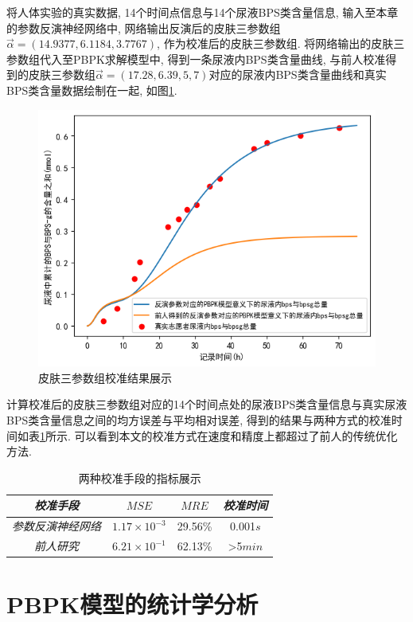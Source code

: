 \documentclass[a4paper,punct=banjiao,twoside]{ctexrep}
\theoremstyle{plain}
\theoremstyle{definition}
\theoremstyle{remark}
\begin{document}
将人体实验的真实数据, 14个时间点信息与14个尿液BPS类含量信息, 输入至本章的参数反演神经网络中, 网络输出反演后的皮肤三参数组$\vec{\alpha}=(14.9377,  6.1184,  3.7767)$, 作为校准后的皮肤三参数组.
将网络输出的皮肤三参数组代入至PBPK求解模型中, 得到一条尿液内BPS类含量曲线, 与前人校准得到的皮肤三参数组$\vec{\alpha}=(17.28,  6.39,  5,7)$对应的尿液内BPS类含量曲线和真实BPS类含量数据绘制在一起, 如图\ref{校准}.
\begin{figure}[H]
  \centering
  \includegraphics[scale=0.6]{./figs/p8.png}
  \caption{皮肤三参数组校准结果展示}
  \label{校准}
\end{figure}
\noindent 计算校准后的皮肤三参数组对应的14个时间点处的尿液BPS类含量信息与真实尿液BPS类含量信息之间的均方误差与平均相对误差, 得到的结果与两种方式的校准时间如表\ref{tab8}所示.
可以看到本文的校准方式在速度和精度上都超过了前人的传统优化方法.
\begin{table}[htbp]
  \centering
  \begin{tabular}[t]{c*{3}{c}}
    \hline
    \textit{校准手段} &$MSE$&$MRE$&\textit{校准时间}\\
    \hline
    \textit{参数反演神经网络} & $1.17\times 10^{-3}$  &   29.56\% &0.001$s$  \\ 
    \textit{前人研究} & $6.21\times 10^{-1}$  &  62.13\%    & >5$min$   \\ 
    \hline
  \end{tabular}
  \caption{\label{tab8}两种校准手段的指标展示} 
\end{table}  

\chapter{PBPK模型的统计学分析}
\end{document}
